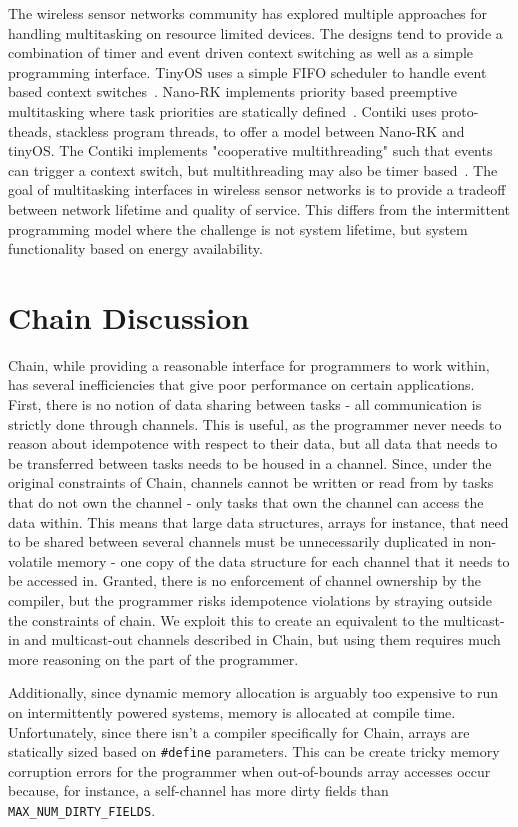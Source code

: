 \documentclass[11pt]{sensys-proc}
\newcommand{\chain}{Chain\xspace}
\begin{document}
The wireless sensor networks community has explored multiple approaches for handling
multitasking on resource limited devices. The designs tend to provide a combination of
timer and event driven context switching as well as a simple programming interface.
TinyOS uses a simple FIFO scheduler to handle event based context switches~\cite{tiny}.
Nano-RK implements priority based preemptive multitasking where task priorities are
statically defined~\cite{nano}. Contiki uses proto-theads, stackless program threads, to
offer a model between Nano-RK and tinyOS. The Contiki implements "cooperative
multithreading" such that events can trigger a context switch, but multithreading may also
be timer based~\cite{contiki}. The goal of multitasking interfaces in wireless sensor
networks is to provide a tradeoff between network lifetime and quality of service. This
differs from the intermittent programming model where the challenge is not system
lifetime, but system functionality based on energy availability.

\section{Chain Discussion}
\chain, while providing a reasonable interface for programmers to work within,
has several inefficiencies that give poor performance on certain applications.
First, there is no notion of data sharing between tasks - all communication is
strictly done through channels. This is useful, as the programmer never needs
to reason about idempotence with respect to their data, but all data that needs
to be transferred between tasks needs to be housed in a channel. Since, under
the original constraints of \chain, channels cannot be written or read from by
tasks that do not own the channel - only tasks that own the channel can access
the data within. This means that large data structures, arrays for instance,
that need to be shared between several channels must be unnecessarily
duplicated in non-volatile memory - one copy of the data structure for each
channel that it needs to be accessed in. Granted, there is no enforcement of
channel ownership by the compiler, but the programmer risks idempotence
violations by straying outside the constraints of chain. We exploit this to
create an equivalent to the multicast-in and multicast-out channels described
in \chain, but using them requires much more reasoning on the part of the programmer.


Additionally, since dynamic memory allocation is arguably too expensive to run
on intermittently powered systems, memory is allocated at compile time.
Unfortunately, since there isn't a compiler specifically for \chain, arrays
are statically sized based on \texttt{\#define} parameters. This can be
create tricky memory corruption errors for the programmer when out-of-bounds
array accesses occur because, for instance, a self-channel has more dirty
fields than \texttt{MAX\_NUM\_DIRTY\_FIELDS}.
\end{document}
